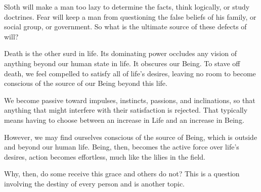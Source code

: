 Sloth will make a man too lazy to determine the facts, think logically, or study doctrines. Fear will keep a man from questioning the false beliefs of his family, or social group, or government. So what is the ultimate source of these defects of will?

Death is the other surd in life. Its dominating power occludes any vision of anything beyond our human state in life. It obscures our Being. To stave off death, we feel compelled to satisfy all of life's desires, leaving no room to become conscious of the source of our Being beyond this life.

We become passive toward impulses, instincts, passions, and inclinations, so that anything that might interfere with their satisfaction is rejected. That typically means having to choose between an increase in Life and an increase in Being.

However, we may find ourselves conscious of the source of Being, which is outside and beyond our human life. Being, then, becomes the active force over life's desires, action becomes effortless, much like the lilies in the field.

Why, then, do some receive this grace and others do not? This is a question involving the destiny of every person and is another topic.



